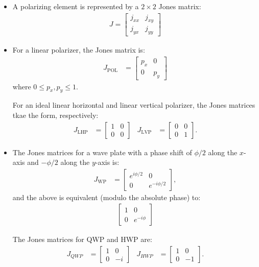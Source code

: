 \documentclass[10pt]{article}
\begin{document}
\begin{itemize}
		\item A polarizing element is represented by a $2\times 2$ Jones matrix:
		\begin{align*}
			J = \begin{bmatrix}
				j_{xx} & j_{xy} \\
				j_{yx} & j_{yy}
			\end{bmatrix}
		\end{align*}

		\item For a linear polarizer, the Jones matrix is:
		\begin{align*}
			J_{\mathrm{POL}} &= \begin{bmatrix}
				p_x & 0 \\
				0 & p_y
			\end{bmatrix}			
		\end{align*}
		where $0 \leq p_x, p_y \leq 1$.

		For an ideal linear horizontal and linear vertical polarizer, the Jones matrices tkae the form, respectively:
		\begin{align*}
			J_{\mathrm{LHP}} &= \begin{bmatrix}
				1 & 0 \\ 0 & 0
			\end{bmatrix} &
			J_{\mathrm{LVP}} &= \begin{bmatrix}
				0 & 0 \\ 0 & 1
			\end{bmatrix}.
		\end{align*}

		\item The Jones matrices for a wave plate with a phase shift of $\phi/2$ along the $x$-axis and $-\phi/2$ along the $y$-axis is:
		\begin{align*}
			J_{\mathrm{WP}} &= \begin{bmatrix}
				e^{i \phi/2} & 0 \\
				0 & e^{-i\phi/2}
			\end{bmatrix},
		\end{align*}
		and the above is equivalent (modulo the absolute phase) to:
		\begin{align*}
			\begin{bmatrix}
				1 & 0 \\
				0 & e^{-i\phi}
			\end{bmatrix}
		\end{align*}

		The Jones matrices for QWP and HWP are:
		\begin{align*}
			J_{QWP} &= \begin{bmatrix}
				1 & 0 \\
				0 & -i
			\end{bmatrix} &
			J_{HWP} &= \begin{bmatrix}
				1 & 0 \\
				0 & -1
			\end{bmatrix}.
		\end{align*}


\end{itemize}
\end{document}
